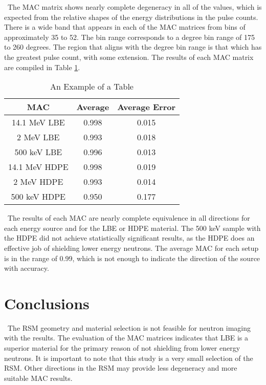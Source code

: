\documentclass[journal]{IEEEtran}
\let\MYoriglatexcaption\caption
\renewcommand{\caption}[2][\relax]{\MYoriglatexcaption[#2]{#2}}
\begin{document}
	\ The MAC matrix shows nearly complete degeneracy in all of the values, which is expected from the relative shapes of the energy distributions in the pulse counts.  There is a wide band that appears in each of the MAC matrices from bins of approximately 35 to 52.  The bin range corresponds to a degree bin range of 175 to 260 degrees.  The region that aligns with the degree bin range is that which has the greatest pulse count, with some extension.  The results of each MAC matrix are compiled in Table \ref{table_example}.  

    \begin{table}[h]
	\renewcommand{\arraystretch}{1.3}
	\caption{An Example of a Table}
	\label{table_example}
	\centering
	\begin{tabular}{|c||c||c|}
	\hline
	MAC & Average & Average Error\\
    \hline
    14.1 MeV LBE & 0.998 & 0.015\\
    \hline
    2 MeV LBE & 0.993 & 0.018\\
    \hline
    500 keV LBE & 0.996 & 0.013\\
    \hline
    14.1 MeV HDPE & 0.998 & 0.019\\
    \hline
    2 MeV HDPE & 0.993 & 0.014\\
    \hline
    500 keV HDPE & 0.950 & 0.177\\
    \hline
	\end{tabular}
	\end{table}

    \ The results of each MAC are nearly complete equivalence in all directions for each energy source and for the LBE or HDPE material.  The 500 keV sample with the HDPE did not achieve statistically significant results, as the HDPE does an effective job of shielding lower energy neutrons.  The average MAC for each setup is in the range of 0.99, which is not enough to indicate the direction of the source with accuracy. 

	\section{Conclusions}
	\ The RSM geometry and material selection is not feasible for neutron imaging with the results.  The evaluation of the MAC matrices indicates that LBE is a superior material for the primary reason of not shielding from lower energy neutrons.  It is important to note that this study is a very small selection of the RSM.  Other directions in the RSM may provide less degeneracy and more suitable MAC results. 
	
\end{document}
